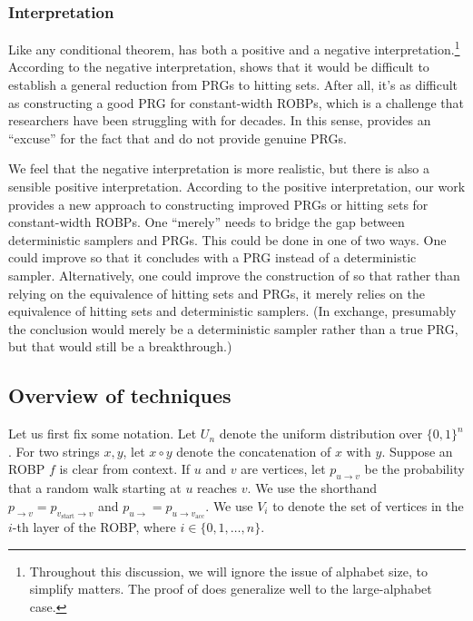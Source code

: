 \subsubsection{Interpretation}
Like any conditional theorem,  has both a positive and a negative interpretation.\footnote{Throughout this discussion, we will ignore the issue of alphabet size, to simplify matters. The proof of  does generalize well to the large-alphabet case.} According to the negative interpretation,  shows that it would be difficult to establish a general reduction from PRGs to hitting sets. After all, it's as difficult as constructing a good PRG for constant-width ROBPs, which is a challenge that researchers have been struggling with for decades. In this sense,  provides an ``excuse'' for the fact that  and  do not provide genuine PRGs.

We feel that the negative interpretation is more realistic, but there is also a sensible positive interpretation. According to the positive interpretation, our work provides a new approach to constructing improved PRGs or hitting sets for constant-width ROBPs. One ``merely'' needs to bridge the gap between deterministic samplers and PRGs. This could be done in one of two ways. One could improve  so that it concludes with a PRG instead of a deterministic sampler. Alternatively, one could improve the construction of  so that rather than relying on the equivalence of hitting sets and PRGs, it merely relies on the equivalence of hitting sets and deterministic samplers. (In exchange, presumably the conclusion would merely be a deterministic sampler rather than a true PRG, but that would still be a breakthrough.)


\subsection{Overview of techniques}

Let us first fix some notation. Let $U_n$ denote the uniform distribution over $\{0, 1\}^n$. For two strings $x, y$, let $x \circ y$ denote the concatenation of $x$ with $y$. 
Suppose an ROBP $f$ is clear from context. If $u$ and $v$ are vertices, let $p_{u \to v}$ be the probability that a random walk starting at $u$ reaches $v$. We use the shorthand $p_{\to v} = p_{v_{\text{start}} \to v}$ and $p_{u \to} = p_{u \to v_{\text{acc}}}$. We use $V_i$ to denote the set of vertices in the $i$-th layer of the ROBP, where $i \in \{0, 1, \dots, n\}$.


